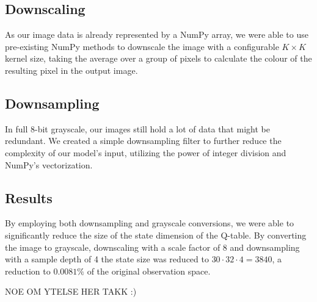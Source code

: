 \subsection{Downscaling}

As our image data is already represented by a NumPy array, we were able to use pre-existing NumPy methods to downscale the image with a configurable $K \times K$ kernel size, taking the average over a group of pixels to calculate the colour of the resulting pixel in the output image.

\subsection{Downsampling}

In full 8-bit grayscale, our images still hold a lot of data that might be redundant. We created a simple downsampling filter to further reduce the complexity of our model's input, utilizing the power of integer division and NumPy's vectorization.

\subsection{Results}

By employing both downsampling and grayscale conversions, we were able to significantly reduce the size of the state dimension of the Q-table. By converting the image to grayscale, downscaling with a scale factor of 8 and downsampling with a sample depth of 4 the state size was reduced to $30 \cdot 32 \cdot 4 = 3840$, a reduction to $0.0081\%$ of the original observation space.

NOE OM YTELSE HER TAKK :)
